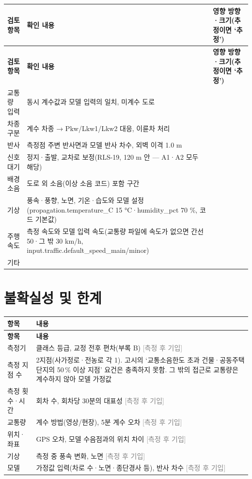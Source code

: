 \documentclass[10.5pt,a4paper]{article}
\newcommand{\TBD}{\textcolor{gray}{[측정 후 기입]}}
\newcommand{\hd}[1]{\cellcolor{headfill}\textbf{\sffamily #1}}
\newcommand{\ip}{\cellcolor{inp}}
\begin{document}
\begin{longtable}{>{\raggedright\arraybackslash}p{}>{\raggedright\arraybackslash}p{}>{\raggedright\arraybackslash}p{}}
\toprule
\hd{검토 항목} & \hd{확인 내용} & \hd{영향 방향·크기(추정이면 `추정')} \\ \midrule
\endfirsthead
\toprule
\hd{검토 항목} & \hd{확인 내용} & \hd{영향 방향·크기(추정이면 `추정')} \\ \midrule
\endhead
\bottomrule
\endlastfoot
교통량 입력 & 동시 계수값과 모델 입력의 일치, 미계수 도로 & \ip{} \\ \midrule
차종 구분 & 계수 차종 → Pkw/Lkw1/Lkw2 대응, 이륜차 처리 & \ip{} \\ \midrule
반사 & 측정점 주변 반사면과 모델 반사 차수, 외벽 이격 1.0 m & \ip{} \\ \midrule
신호 대기 & 정지·출발, 교차로 보정(RLS-19, 120 m 안 --- A1·A2 모두 해당) & \ip{} \\ \midrule
배경소음 & 도로 외 소음(이상 소음 코드) 포함 구간 & \ip{} \\ \midrule
기상 & 풍속·풍향, 노면, 기온·습도와 모델 설정(propagation.temperature\_C 15 °C·humidity\_pct 70 \%, 코드 기본값) & \ip{} \\ \midrule
주행속도 & 측정 속도와 모델 입력 속도(교통량 파일에 속도가 없으면 간선 50·그 밖 30 km/h, input.traffic.default\_speed\_main/minor) & \ip{} \\ \midrule
기타 &  & \ip{} \\
\end{longtable}
\addtocounter{table}{-1}
\normalsize
{}\section{불확실성 및 한계}
\footnotesize
\begin{longtable}{>{\raggedright\arraybackslash}p{}>{\raggedright\arraybackslash}p{}}
\toprule
\hd{항목} & \hd{내용} \\ \midrule
\endfirsthead
\toprule
\hd{항목} & \hd{내용} \\ \midrule
\endhead
\bottomrule
\endlastfoot
측정기 & \ip{}클래스 등급, 교정 전후 편차(부록 B) \TBD \\ \midrule
측정 지점 수 & 2지점(사가정로·전농로 각 1). 고시의 `교통소음한도 초과 건물·공동주택 단지의 50\,\% 이상 지점' 요건은 충족하지 못함. 그 밖의 접근로 교통량은 계수하지 않아 모델 가정값 \\ \midrule
측정 횟수·시간 & \ip{}회차 수, 회차당 30분의 대표성 \TBD \\ \midrule
교통량 & \ip{}계수 방법(영상/현장), 5분 계수 오차 \TBD \\ \midrule
위치·좌표 & \ip{}GPS 오차, 모델 수음점과의 위치 차이 \TBD \\ \midrule
기상 & \ip{}측정 중 풍속 변화, 노면 \TBD \\ \midrule
모델 & \ip{}가정값 입력(차로 수·노면·종단경사 등), 반사 차수 \TBD \\
\end{longtable}
\end{document}
